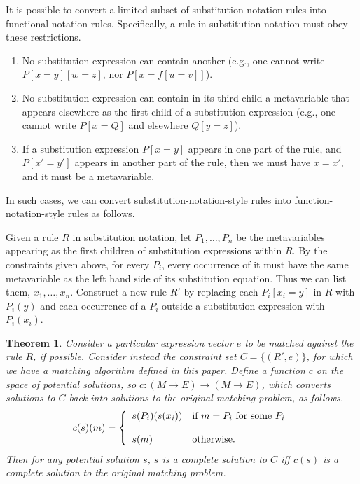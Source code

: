\documentclass{article}
\newtheorem{thm}{Theorem}
\begin{document}
It is possible to convert a limited subset of substitution notation rules into functional notation rules.  Specifically, a rule in substitution notation must obey these restrictions.
\begin{enumerate}
\item	No substitution expression can contain another (e.g., one cannot write $P[x=y][w=z]$, nor $P[x=f[u=v]]$).
\item	No substitution expression can contain in its third child a metavariable that appears elsewhere as the first child of a substitution expression (e.g., one cannot write $P[x=Q]$ and elsewhere $Q[y=z]$).
\item	If a substitution expression $P[x=y]$ appears in one part of the rule, and $P[x'=y']$ appears in another part of the rule, then we must have $x=x'$, and it must be a metavariable.
\end{enumerate}
In such cases, we can convert substitution-notation-style rules into function-notation-style rules as follows.

Given a rule $R$ in substitution notation, let $P_1,\ldots,P_n$ be the metavariables appearing as the first children of substitution expressions within $R$.  By the constraints given above, for every $P_i$, every occurrence of it must have the same metavariable as the left hand side of its substitution equation.  Thus we can list them, $x_1,\ldots,x_n$.  Construct a new rule $R'$ by replacing each $P_i[x_i=y]$ in $R$ with $P_i(y)$ and each occurrence of a $P_i$ outside a substitution expression with $P_i(x_i)$.

\begin{thm}\label{T:c}
Consider a particular expression vector $e$ to be matched against the rule $R$, if possible.  Consider instead the constraint set $C=\{(R',e)\}$, for which we have a matching algorithm defined in this paper.  Define a function $c$ on the space of potential solutions, so $c:(M\to E)\to(M\to E)$, which converts solutions to $C$ back into solutions to the original matching problem, as follows.
	$$	c(s)(m)=\left\{
			\begin{array}{l l}
				s(P_i)(s(x_i)) & \text{if $m=P_i$ for some $P_i$} \\
				  &   \\
				s(m) & \text{otherwise.}
			\end{array}
		\right.	$$
Then for any potential solution $s$, $s$ is a complete solution to $C$ iff $c(s)$ is a complete solution to the original matching problem.
\end{thm}
\end{document}
